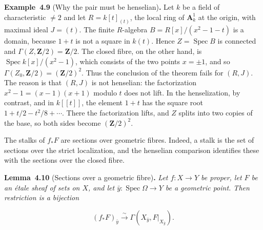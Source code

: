 \documentclass[11pt]{article}
\newenvironment{bpstatement}[2]{\par\addvspace{0.6\baselineskip}\noindent\textbf{#1}#2\textbf{.}\enspace\ignorespaces}
  {\par\addvspace{0.4\baselineskip}}
\newenvironment{bpstatementit}[2]{\begin{bpstatement}{#1}{#2}\itshape\ignorespaces}{\end{bpstatement}}
\begin{document}
\label{bp310}%
\begin{bpstatement}{Example~4.9}{ (Why the pair must be henselian)}
Let \(k\) be a field of characteristic \(\neq2\) and let \(R=k[t]_{(t)}\), the local ring of \(\mathbf A^1_k\) at the origin, with maximal ideal \(J=(t)\). The finite \(R\)-algebra \(B=R[x]/(x^2-1-t)\) is a domain, because \(1+t\) is not a square in \(k(t)\). Hence \(Z=\operatorname{Spec}B\) is connected and \(\Gamma(Z,\mathbf Z/2)=\mathbf Z/2\). The closed fibre, on the other hand, is \(\operatorname{Spec}k[x]/(x^2-1)\), which consists of the two points \(x=\pm1\), and so \(\Gamma(Z_0,\mathbf Z/2)=(\mathbf Z/2)^2\). Thus the conclusion of the theorem fails for \((R,J)\). The reason is that \((R,J)\) is not henselian: the factorization \(x^2-1=(x-1)(x+1)\) modulo \(t\) does not lift. In the henselization, by contrast, and in \(k[[t]]\), the element \(1+t\) has the square root \(1+t/2-t^2/8+\cdots\). There the factorization lifts, and \(Z\) splits into two copies of the base, so both sides become \((\mathbf Z/2)^2\).
\end{bpstatement}

\label{bp311}%
The stalks of \(f_*F\) are sections over geometric fibres. Indeed, a stalk is the set of sections over the strict localization, and the henselian comparison identifies these with the sections over the closed fibre.

\label{bp312}%
\begin{bpstatementit}{Lemma~4.10}{ (Sections over a geometric fibre)}
Let \(f:X\to Y\) be proper, let \(F\) be an étale sheaf of sets on \(X\), and let \(\bar y:\operatorname{Spec}\Omega\to Y\) be a geometric point. Then restriction is a bijection

\[
(f_*F)_{\bar y}\xrightarrow{\sim}
\Gamma(X_{\bar y},F|_{X_{\bar y}}).
\tag{4.6}
\]
\end{bpstatementit}
\end{document}

